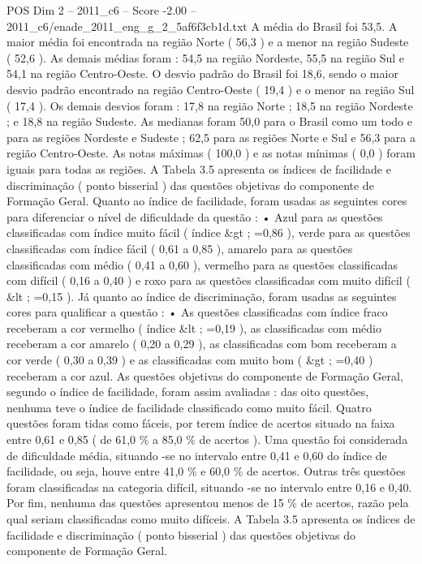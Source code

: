 \begin{textsample}{POS Dim 2 – 2011\_c6 – Score -2.00 – 2011\_c6/enade\_2011\_eng\_g\_2\_5af6f3cb1d.txt}
A média do Brasil foi 53,5.
A maior média foi encontrada na região Norte ( 56,3 ) e a menor na região Sudeste ( 52,6 ).
As demais médias foram : 54,5 na região Nordeste, 55,5 na região Sul e 54,1 na região Centro-Oeste.
O desvio padrão do Brasil foi 18,6, sendo o maior desvio padrão encontrado na região Centro-Oeste ( 19,4 ) e o menor na região Sul ( 17,4 ).
Os demais desvios foram : 17,8 na região Norte ; 18,5 na região Nordeste ; e 18,8 na região Sudeste.
As medianas foram 50,0 para o Brasil como um todo e para as regiões Nordeste e Sudeste ; 62,5 para as regiões Norte e Sul e 56,3 para a região Centro-Oeste.
As notas máximas ( 100,0 ) e as notas mínimas ( 0,0 ) foram iguais para todas as regiões.
A Tabela 3.5 apresenta os índices de facilidade e discriminação ( ponto bisserial ) das questões objetivas do componente de Formação Geral.
Quanto ao índice de facilidade, foram usadas as seguintes cores para diferenciar o nível de dificuldade da questão : • Azul para as questões classificadas com índice muito fácil ( índice \&gt ; =0,86 ), verde para as questões classificadas com índice fácil ( 0,61 a 0,85 ), amarelo para as questões classificadas com médio ( 0,41 a 0,60 ), vermelho para as questões classificadas com difícil ( 0,16 a 0,40 ) e roxo para as questões classificadas com muito difícil ( \&lt ; =0,15 ).
Já quanto ao índice de discriminação, foram usadas as seguintes cores para qualificar a questão : • As questões classificadas com índice fraco receberam a cor vermelho ( índice \&lt ; =0,19 ), as classificadas com médio receberam a cor amarelo ( 0,20 a 0,29 ), as classificadas com bom receberam a cor verde ( 0,30 a 0,39 ) e as classificadas com muito bom ( \&gt ; =0,40 ) receberam a cor azul.
As questões objetivas do componente de Formação Geral, segundo o índice de facilidade, foram assim avaliadas : das oito questões, nenhuma teve o índice de facilidade classificado como muito fácil.
Quatro questões foram tidas como fáceis, por terem índice de acertos situado na faixa entre 0,61 e 0,85 ( de 61,0 \% a 85,0 \% de acertos ).
Uma questão foi considerada de dificuldade média, situando -se no intervalo entre 0,41 e 0,60 do índice de facilidade, ou seja, houve entre 41,0 \% e 60,0 \% de acertos.
Outras três questões foram classificadas na categoria difícil, situando -se no intervalo entre 0,16 e 0,40.
Por fim, nenhuma das questões apresentou menos de 15 \% de acertos, razão pela qual seriam classificadas como muito difíceis.
A Tabela 3.5 apresenta os índices de facilidade e discriminação ( ponto bisserial ) das questões objetivas do componente de Formação Geral.

\end{textsample}
